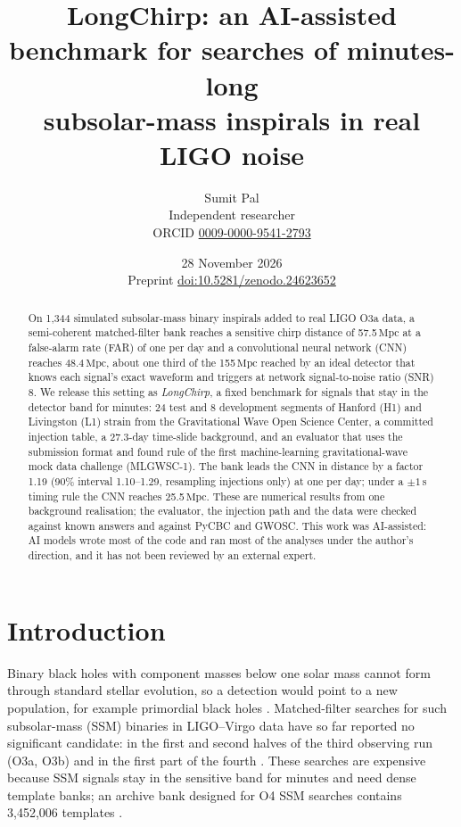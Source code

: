 \documentclass[11pt]{article}
\title{LongChirp: an AI-assisted benchmark for searches of minutes-long\\ subsolar-mass inspirals in real LIGO noise}
\author{Sumit Pal\\ Independent researcher\\ ORCID \href{https://orcid.org/0009-0000-9541-2793}{0009-0000-9541-2793}}
\date{28 November 2026\\ Preprint \href{https://doi.org/10.5281/zenodo.24623652}{doi:10.5281/zenodo.24623652}}
\newcommand{\Mpc}{\ensuremath{\,\mathrm{Mpc}}}
\begin{document}
\maketitle

\begin{abstract}
On 1,344 simulated subsolar-mass binary inspirals added to real LIGO O3a data, a semi-coherent matched-filter bank
reaches a sensitive chirp distance of 57.5\Mpc{} at a false-alarm rate (FAR) of one per day and a convolutional neural
network (CNN) reaches 48.4\Mpc{}, about one third of the 155\Mpc{} reached by an ideal detector that knows each
signal's exact waveform and triggers at network signal-to-noise ratio (SNR) 8. We release this setting as
\emph{LongChirp}, a fixed benchmark for signals that stay in the detector band for minutes: 24 test and 8 development
segments of Hanford (H1) and Livingston (L1) strain from the Gravitational Wave Open Science Center, a committed
injection table, a 27.3-day time-slide background, and an evaluator that uses the submission format and found rule of
the first machine-learning gravitational-wave mock data challenge (MLGWSC-1). The bank leads the CNN in distance by a
factor 1.19 (90\% interval 1.10--1.29, resampling injections only) at one per day; under a $\pm1$\,s timing rule the
CNN reaches 25.5\Mpc{}. These are numerical results from one background realisation; the evaluator, the injection
path and the data were checked against known answers and against PyCBC and GWOSC. This work was AI-assisted: AI
models wrote most of the code and ran most of the analyses under the author's direction, and it has not been reviewed
by an external expert.
\end{abstract}

\section{Introduction}
Binary black holes with component masses below one solar mass cannot form through standard stellar evolution, so a
detection would point to a new population, for example primordial black holes \cite{carr2020}. Matched-filter
searches for such subsolar-mass (SSM) binaries in LIGO--Virgo data have so far reported no significant candidate:
in the first and second halves of the third observing run (O3a, O3b) \cite{lvk_o3a_ssm,lvk_o3b_ssm,nitz_wang_o3a}
and in the first part of the fourth \cite{kacanja_o4a}. These searches are expensive because SSM signals stay in the
sensitive band for minutes and need dense template banks; an archive bank designed for O4 SSM searches contains
3,452,006 templates \cite{hanna_bank}.
\end{document}
